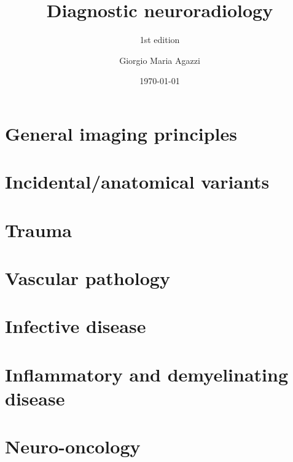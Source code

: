 \documentclass[oneside,a4paper,11pt,explicit,twocolumn]{book}
\title{Diagnostic neuroradiology}
\subtitle{1st edition}
\date{\today}
\author{Giorgio Maria Agazzi}
\begin{document}
\dominitoc  %
\maketitle
\tableofcontents


\part{General imaging principles}






\part{Incidental/anatomical variants}


\part{Trauma}



\part{Vascular pathology}








\part{Infective disease}



\part{Inflammatory and demyelinating disease}

\part{Neuro-oncology}



















\end{document}
